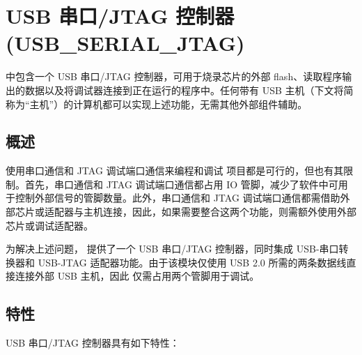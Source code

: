 \documentclass[main\_\_CN.tex]{subfiles}
\begin{document}

\ifglobal
\else
    {\let\clearpage\relax \listoftodos}
    {\let\clearpage\relax \listofdonetodos}
    \tableofcontents
\fi



\hypertarget{usbserialjtag}{}
\chapter{USB 串口/JTAG 控制器 (USB\_SERIAL\_JTAG)}
\label{mod:usbserialjtag}

\chipname{} 中包含一个 USB 串口/JTAG 控制器，可用于烧录芯片的外部 flash、读取程序输出的数据以及将调试器连接到正在运行的程序中。任何带有 USB 主机（下文将简称为“主机”）的计算机都可以实现上述功能，无需其他外部组件辅助。

\section{概述}

使用串口通信和 JTAG 调试端口通信来编程和调试 \chipname{} 项目都是可行的，但也有其限制。首先，串口通信和 JTAG 调试端口通信都占用 IO 管脚，减少了软件中可用于控制外部信号的管脚数量。此外，串口通信和 JTAG 调试端口通信都需借助外部芯片或适配器与主机连接，因此，如果需要整合这两个功能，则需额外使用外部芯片或调试适配器。

为解决上述问题，\chipname{} 提供了一个 USB 串口/JTAG 控制器，同时集成 USB-串口转换器和 USB-JTAG 适配器功能。由于该模块仅使用 USB 2.0 所需的两条数据线直接连接外部 USB 主机，因此 \chipname{} 仅需占用两个管脚用于调试。


\section{特性}
\label{sec:usbserialjtag-features}

USB 串口/JTAG 控制器具有如下特性：
\end{document}
